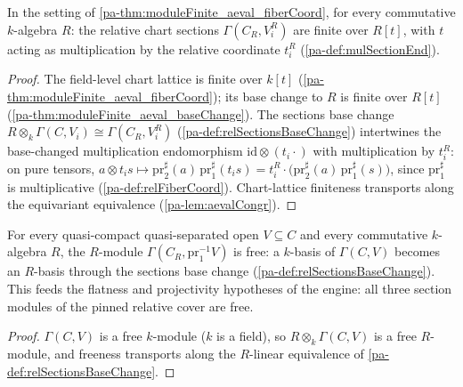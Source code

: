 \begin{theorem}
  \label{pa-thm:moduleFinite_aeval_relFiberCoord}
  \leanok

  In the setting of \ref{pa-thm:moduleFinite_aeval_fiberCoord}, for every commutative
  \(k\)-algebra \(R\): the relative chart sections \(\Gamma(C_R, V_i^R)\) are finite
  over \(R[t]\), with \(t\) acting as multiplication by the relative coordinate
  \(t_i^R\) (\ref{pa-def:mulSectionEnd}).
\end{theorem}
\begin{proof}
  \leanok
  The field-level chart lattice is finite over \(k[t]\)
  (\ref{pa-thm:moduleFinite_aeval_fiberCoord}); its base change to \(R\) is finite over
  \(R[t]\) (\ref{pa-thm:moduleFinite_aeval_baseChange}). The sections base change
  \(R \otimes_k \Gamma(C, V_i) \cong \Gamma(C_R, V_i^R)\)
  (\ref{pa-def:relSectionsBaseChange}) intertwines the base-changed multiplication
  endomorphism \(\mathrm{id} \otimes (t_i \cdot)\) with multiplication by \(t_i^R\):
  on pure tensors, \(a \otimes t_i s \mapsto \mathrm{pr}_2^{\sharp}(a)\,
  \mathrm{pr}_1^{\sharp}(t_i s) = t_i^R \cdot \bigl(\mathrm{pr}_2^{\sharp}(a)\,
  \mathrm{pr}_1^{\sharp}(s)\bigr)\), since \(\mathrm{pr}_1^{\sharp}\) is multiplicative
  (\ref{pa-def:relFiberCoord}). Chart-lattice finiteness transports along the equivariant
  equivalence (\ref{pa-lem:aevalCongr}).
\end{proof}

\begin{theorem}
  \label{pa-thm:free_relSections}
  \leanok

  For every quasi-compact quasi-separated open \(V \subseteq C\) and every commutative
  \(k\)-algebra \(R\), the \(R\)-module \(\Gamma(C_R, \mathrm{pr}_1^{-1}V)\) is free:
  a \(k\)-basis of \(\Gamma(C, V)\) becomes an \(R\)-basis through the sections base
  change (\ref{pa-def:relSectionsBaseChange}). This feeds the flatness and projectivity
  hypotheses of the engine: all three section modules of the pinned relative cover are
  free.
\end{theorem}
\begin{proof}
  \leanok
  \(\Gamma(C, V)\) is a free \(k\)-module (\(k\) is a field), so
  \(R \otimes_k \Gamma(C, V)\) is a free \(R\)-module, and freeness transports along
  the \(R\)-linear equivalence of \ref{pa-def:relSectionsBaseChange}.
\end{proof}

